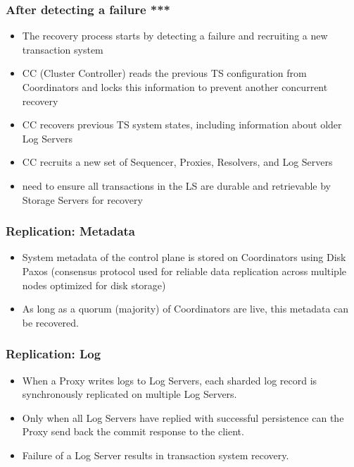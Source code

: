 \begin{frame}
	\frametitle{After detecting a failure ***}
    \begin{itemize}
        \item The recovery process starts by
        detecting a failure and recruiting a new transaction system
        \item CC (Cluster Controller) reads the previous TS configuration from Coordinators and locks this information
        to prevent another concurrent recovery
        \item CC recovers previous TS system states, including information about older Log Servers
        \item CC recruits a new set of Sequencer, Proxies, Resolvers,
        and Log Servers
        \item need to ensure all transactions in the LS are durable and retrievable by Storage Servers for recovery

    \end{itemize}

\end{frame}





\begin{frame}
	\frametitle{Replication: Metadata}
    \begin{itemize}
      \item System metadata of the control plane is stored on Coordinators using Disk Paxos (consensus protocol used for reliable data replication across multiple nodes optimized for disk storage)
      \item As long as a quorum (majority) of Coordinators are live, this metadata can be recovered.

\end{itemize}
\end{frame}



\begin{frame}
	\frametitle{Replication: Log}
\begin{itemize}

      \item When a Proxy writes logs to Log Servers, each sharded log record is synchronously replicated on multiple Log Servers.
      \item Only when all Log Servers have replied with successful persistence can the Proxy send back the commit response to the client.
      \item Failure of a Log Server results in transaction system recovery.

\end{itemize}
\end{frame}

